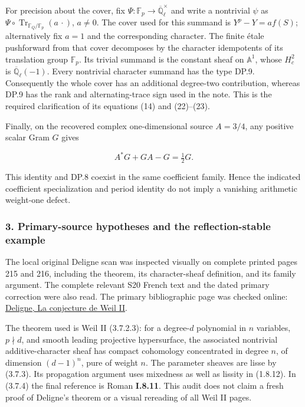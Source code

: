 \documentclass{article}
\begin{document}
For precision about the cover, fix \(\Psi:\mathbb F_p\to\overline{\mathbb Q}_{\ell}^{\times}\) and write a nontrivial \(\psi\) as \(\Psi\circ\operatorname{Tr}_{\mathbb F_Q/\mathbb F_p}(a\,\cdot)\), \(a\ne0\). The cover used for this summand is \(Y^p-Y=a f(S)\); alternatively fix \(a=1\) and the corresponding character. The finite étale pushforward from that cover decomposes by the character idempotents of its translation group \(\mathbb F_p\). Its trivial summand is the constant sheaf on \(\mathbb A^1\), whose \(H_c^2\) is \(\overline{\mathbb Q}_{\ell}(-1)\). Every nontrivial character summand has the type DP.9. Consequently the whole cover has an additional degree-two contribution, whereas DP.9 has the rank and alternating-trace sign used in the note. This is the required clarification of its equations (14) and (22)--(23).

Finally, on the recovered complex one-dimensional source \(A=3/4\), any positive scalar Gram \(G\) gives

\[
A^*G+GA-G=\tfrac12G.
\tag{DP.10}
\]

This identity and DP.8 coexist in the same coefficient family. Hence the indicated coefficient specialization and period identity do not imply a vanishing arithmetic weight-one defect.

\subsubsection{3. Primary-source hypotheses and the reflection-stable example}\label{endpoint-purity_review--primary-source-hypotheses-and-the-reflection-stable-example}

The local original Deligne scan was inspected visually on complete printed pages 215 and 216, including the theorem, its character-sheaf definition, and its family argument. The complete relevant S20 French text and the dated primary correction were also read. The primary bibliographic page was checked online: \href{https://www.numdam.org/item/PMIHES_1980__52__137_0/}{Deligne, La conjecture de Weil II}.

The theorem used is Weil II (3.7.2.3): for a degree-\(d\) polynomial in \(n\) variables, \(p\nmid d\), and smooth leading projective hypersurface, the associated nontrivial additive-character sheaf has compact cohomology concentrated in degree \(n\), of dimension \((d-1)^n\), pure of weight \(n\). The parameter sheaves are lisse by (3.7.3). Its propagation argument uses mixedness as well as lissity in (1.8.12). In (3.7.4) the final reference is Roman \textbf{I.8.11}. This audit does not claim a fresh proof of Deligne's theorem or a visual rereading of all Weil II pages.
\end{document}
